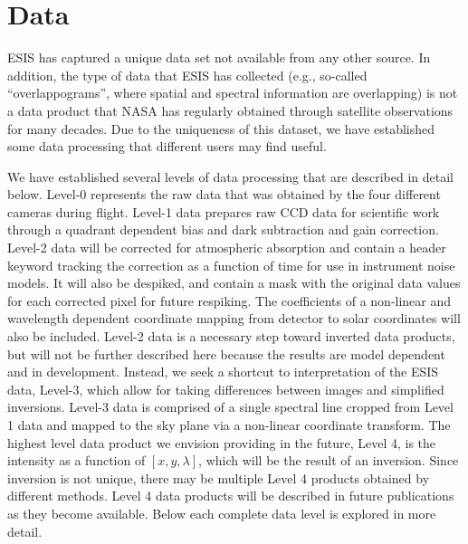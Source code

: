 {\section{Data} 

	ESIS has captured a unique data set not  available from any other source.  
	In addition, the type of data that ESIS has collected (e.g., so-called ``overlappograms'', where spatial and spectral information are overlapping) is not a data product that NASA has regularly obtained through satellite observations for many decades.  Due to the uniqueness of this dataset, we have established some data processing that different users may find useful.
	 
  
    We have established several levels of data processing that are described in detail below.
    Level-0 represents the raw data that was obtained by the four different cameras during flight.
    Level-1 data prepares raw CCD data for scientific work through a quadrant dependent bias and dark subtraction and gain correction. 
    Level-2 data will be corrected for atmospheric absorption and contain a header keyword tracking the correction as a function of time for use in instrument noise models.
    It will also be despiked, and contain a mask with the original data values for each corrected pixel for future respiking.
    The coefficients of a non-linear and wavelength dependent coordinate mapping from detector to solar coordinates will also be included. 
    Level-2 data is a necessary step toward inverted data products,  but will not be further described here because the results are model dependent and in development. 
    Instead, we seek a shortcut to interpretation of the ESIS data, Level-3, which allow for taking differences between images and simplified inversions.
    Level-3 data is comprised of a single spectral line cropped from Level 1 data and mapped to the sky plane via a non-linear coordinate transform.
    The highest level data product we envision providing in the future, Level 4, is the intensity as a function of $[x, y , \lambda]$, which will be the result of an inversion.
    Since inversion is not unique, there may be multiple Level 4 products obtained by different methods.  
    Level 4 data products will be described in future publications as they become available.  
    Below each complete data level is explored in more detail.
    
}
